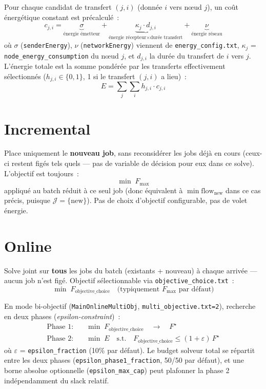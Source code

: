 \documentclass[11pt]{article}
\begin{document}
Pour chaque candidat de transfert $(j, i)$ (donnée $i$ vers nœud $j$), un coût énergétique
constant est précalculé~:
\[
  c_{j,i} = \underbrace{\sigma}_{\text{énergie émetteur}}
          + \underbrace{\kappa_j \cdot d_{j,i}}_{\text{énergie récepteur} \times \text{durée transfert}}
          + \underbrace{\nu}_{\text{énergie réseau}}
\]
où $\sigma$ (\texttt{senderEnergy}), $\nu$ (\texttt{networkEnergy}) viennent de
\texttt{energy\_config.txt}, $\kappa_j$ = \texttt{node\_energy\_consumption} du nœud $j$, et
$d_{j,i}$ la durée du transfert de $i$ vers $j$. L'énergie totale est la somme pondérée par les
transferts effectivement sélectionnés ($h_{j,i} \in \{0,1\}$, 1 si le transfert $(j,i)$ a lieu)~:
\[
  E = \sum_{j} \sum_{i} h_{j,i} \cdot c_{j,i}
\]

\section{Incremental}

Place uniquement le \textbf{nouveau job}, sans reconsidérer les jobs déjà en cours (ceux-ci
restent figés tels quels — pas de variable de décision pour eux dans ce solve). L'objectif est
toujours~:
\[
  \min \; F_{\mathrm{max}}
\]
appliqué au batch réduit à ce seul job (donc équivalent à $\min \mathrm{flow}_{\mathrm{new}}$ dans
ce cas précis, puisque $\mathcal{J} = \{\text{new}\}$). Pas de choix d'objectif configurable, pas
de volet énergie.

\section{Online}

Solve joint sur \textbf{tous} les jobs du batch (existants + nouveau) à chaque arrivée — aucun job
n'est figé. Objectif sélectionnable via \texttt{objective\_choice.txt}~:
\[
  \min \; F_{\mathrm{objective\_choice}} \quad \text{(typiquement } F_{\mathrm{max}} \text{ par défaut)}
\]

En mode bi-objectif (\texttt{MainOnlineMultiObj}, \texttt{multi\_objective.txt=2}), recherche en
deux phases (\emph{epsilon-constraint})~:
\begin{align}
  \text{Phase 1:}\quad & \min \; F_{\mathrm{objective\_choice}} \quad \to \quad F^\star \\
  \text{Phase 2:}\quad & \min \; E
  \quad \text{s.t.} \quad F_{\mathrm{objective\_choice}} \le (1+\varepsilon) \, F^\star
\end{align}
où $\varepsilon$ = \texttt{epsilon\_fraction} (10\% par défaut). Le budget solveur total se
répartit entre les deux phases (\texttt{epsilon\_phase1\_fraction}, 50/50 par défaut), et une
borne absolue optionnelle (\texttt{epsilon\_max\_cap}) peut plafonner la phase 2 indépendamment du
slack relatif.
\end{document}
